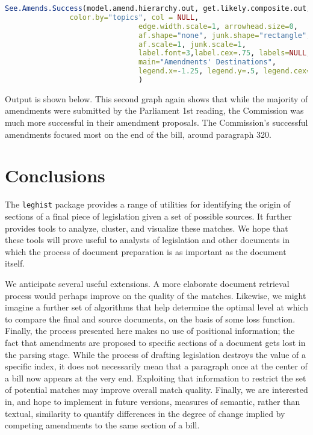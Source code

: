 \documentclass[11pt]{article}
\begin{document}
\begin{lstlisting}[language=R, numbers=none]
See.Amends.Success(model.amend.hierarchy.out, get.likely.composite.out, committees,
		       color.by="topics", col = NULL,
                               edge.width.scale=1, arrowhead.size=0,
                               af.shape="none", junk.shape="rectangle",
                               af.scale=1, junk.scale=1,
                               label.font=3,label.cex=.75, labels=NULL,
                               main="Amendments' Destinations",
                               legend.x=-1.25, legend.y=.5, legend.cex=.5
                               )
\end{lstlisting}

Output is shown below. This second graph again shows that while the majority of amendments were submitted by the Parliament 1st reading, the Commission was much more successful in their amendment proposals. The Commission's successful amendments focused most on the end of the bill, around paragraph 320.


\section{Conclusions}
\label{sec:conclusions}

The \texttt{leghist} package provides a range of utilities for
identifying the origin of sections of a final piece of legislation
given a set of possible sources. It further provides tools to analyze,
cluster, and visualize these matches. We hope that these tools will
prove useful to analysts of legislation and other documents in which
the process of document preparation is as important as the document
itself. 

We anticipate several useful extensions. A more elaborate document
retrieval process would perhaps improve on the quality of the
matches. Likewise, we might imagine a further set of algorithms that
help determine the optimal level at which to compare the final and
source documents, on the basis of some loss function. Finally, the
process presented here makes no use of positional information; the
fact that amendments are proposed to specific sections of a document
gets lost in the parsing stage. While the process of drafting
legislation destroys the value of a specific index, it does not
necessarily mean that a paragraph once at the center of a bill now
appears at the very end. Exploiting that information to restrict the
set of potential matches may improve overall match quality. Finally,
we are interested in, and hope to implement in future versions,
measures of semantic, rather than textual, similarity to quantify
differences in the degree of change implied by competing amendments to
the same section of a bill. 





\end{document}
